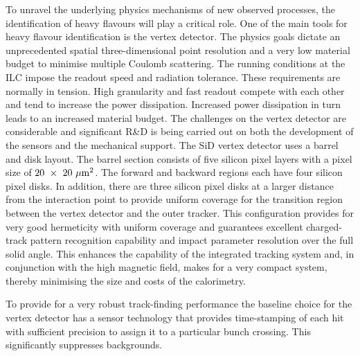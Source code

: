 To unravel the underlying physics mechanisms of new observed processes, the
identification of heavy flavours will play a critical role. One of the main
tools for heavy flavour identification is the vertex detector. The physics goals
dictate an unprecedented spatial three-dimensional point resolution and a very
low material budget to minimise multiple Coulomb scattering. The running 
conditions at the ILC impose the readout speed and radiation tolerance. 
These requirements are normally in tension. High
granularity and fast readout compete with each other and tend to increase the
power dissipation. Increased power dissipation in turn leads to an increased
material budget. The challenges on the vertex detector are considerable and
significant R\&D is being carried out on both the development of the sensors and
the mechanical support.
The SiD vertex detector uses a barrel and disk layout. The barrel section
consists of five silicon pixel layers with a pixel size of
$20~\times~20~\mu\mathrm{m}^2$. The forward and backward regions each have four
silicon pixel disks. In addition, there are three silicon pixel disks at a
larger distance from the interaction point to provide uniform coverage for the
transition region between the vertex detector and the outer tracker. This
configuration provides for very good hermeticity with uniform coverage and
guarantees excellent charged-track pattern recognition capability and impact parameter resolution 
over the full solid angle. 
This enhances the capability of the integrated tracking system and, 
in conjunction with the high magnetic field, makes for a very compact
system, thereby minimising the size and costs of the calorimetry.

To provide for a very robust track-finding performance the baseline 
choice for the vertex detector has a sensor technology that provides
time-stamping of each hit with sufficient precision to assign it to
a particular bunch crossing. This significantly suppresses
backgrounds. 


